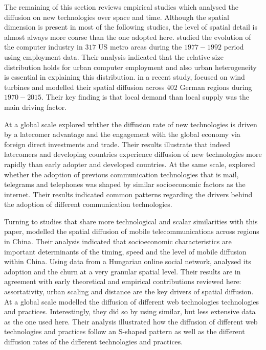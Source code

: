\documentclass[
  authoryear,
  preprint,
  3p]{elsarticle}
\begin{document}
The remaining of this section reviews empirical studies which analysed
the diffusion on new technologies over space and time. Although the
spatial dimension is present in most of the following studies, the level
of spatial detail is almost always more coarse than the one adopted
here. \citet{beardsell1999spatial} studied the evolution of the computer
industry in \(317\) US metro areas during the \(1977-1992\) period using
employment data. Their analysis indicated that the relative size
distribution holds for urban computer employment and also urban
heterogeneity is essential in explaining this distribution. in a recent
study, \citet{bednarz2020pulled} focused on wind turbines and modelled
their spatial diffusion across \(402\) German regions during
\(1970-2015\). Their key finding is that local demand than local supply
was the main driving factor.

At a global scale \citet{perkins2005international} explored whther the
diffusion rate of new technologies is driven by a latecomer advantage
and the engagement with the global economy via foreign direct
investments and trade. Their results illustrate that indeed latecomers
and developing countries experience diffusion of new technologies more
rapidly than early adopter and developed countries. At the same scale,
\citet{perkins2011internet} explored whether the adoption of previous
communication technologies that is mail, telegrams and telephones was
shaped by similar socioeconomic factors as the internet. Their results
indicated common patterns regarding the drivers behind the adoption of
different communication technologies.

Turning to studies that share more technological and scalar similarities
with this paper, \citet{ding2010modeling} modelled the spatial diffusion
of mobile telecommunications across regions in China. Their analysis
indicated that socioeconomic characteristics are important determinants
of the timing, speed and the level of mobile diffusion within China.
Using data from a Hungarian online social network,
\citet{lengyel2020role} analysed its adoption and the churn at a very
granular spatial level. Their results are in agreement with early
theoretical and empirical contributions reviewed here: assortativity,
urban scaling and distance are the key drivers of spatial diffusion. At
a global scale \citet{PAPAGIANNIDIS2015308} modelled the diffusion of
different web technologies technologies and practices. Interestingly,
they did so by using similar, but less extensive data as the one used
here. Their analysis illustrated how the diffusion of different web
technologies and practices follow an S-shaped pattern as well as the
different diffusion rates of the different technologies and practices.
\end{document}
